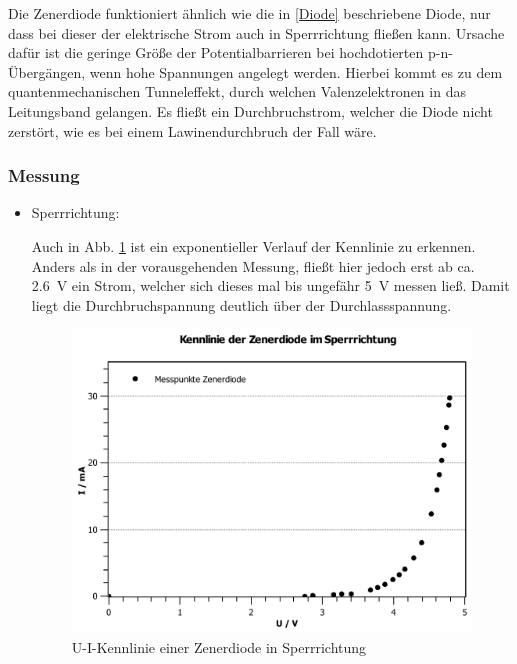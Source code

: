 \documentclass[11pt,a4paper,titlepage, ngerman]{article}
\begin{document}
			Die Zenerdiode funktioniert ähnlich wie die in \ref{Diode} beschriebene Diode, nur dass bei dieser der elektrische Strom auch in Sperrrichtung fließen kann.
			Ursache dafür ist die geringe Größe der Potentialbarrieren bei hochdotierten p-n-Übergängen, wenn hohe Spannungen angelegt werden.
			Hierbei kommt es zu dem quantenmechanischen Tunneleffekt, durch welchen Valenzelektronen in das Leitungsband gelangen.
			Es fließt ein Durchbruchstrom, welcher die Diode nicht zerstört, wie es bei einem Lawinendurchbruch der Fall wäre.
			
			\subsubsection*{Messung}
			
				 \begin{itemize}
				 	
				 	\item Sperrrichtung: 
				 	
				 	Auch in Abb. \ref{KL b1} ist ein exponentieller Verlauf der Kennlinie zu erkennen.
				 	Anders als in der vorausgehenden Messung, fließt hier jedoch erst ab ca. \SI{2.6}{\V} ein Strom, welcher sich dieses mal bis ungefähr \SI{5}{\V} messen ließ.
				 	Damit liegt die Durchbruchspannung deutlich über der Durchlassspannung.
				 	
				 	\begin{figure}
				 		\centering
				 		\includegraphics[width=\textwidth]{KennlinieZenerdiodeSperrrichtung.pdf}
				 		\caption{U-I-Kennlinie einer Zenerdiode in Sperrrichtung}
				 		\label{KL b1}
				 	\end{figure}
				 	

\end{itemize}
\end{document}
